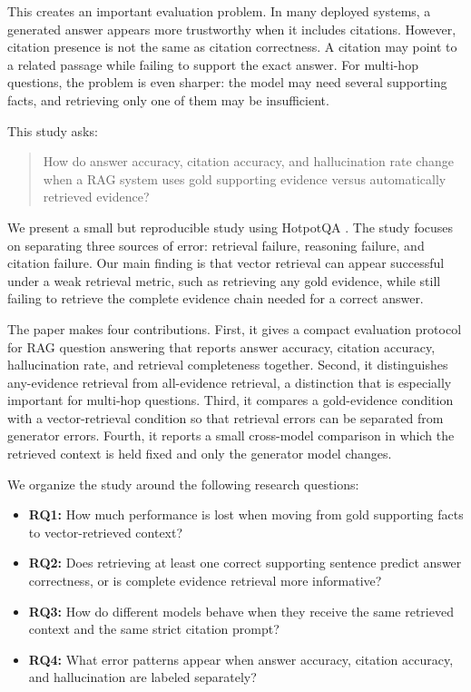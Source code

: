 \documentclass[10pt,twocolumn]{article}
\begin{document}
This creates an important evaluation problem. In many deployed systems, a generated answer appears more trustworthy when it includes citations. However, citation presence is not the same as citation correctness. A citation may point to a related passage while failing to support the exact answer. For multi-hop questions, the problem is even sharper: the model may need several supporting facts, and retrieving only one of them may be insufficient.

This study asks:

\begin{quote}
How do answer accuracy, citation accuracy, and hallucination rate change when a RAG system uses gold supporting evidence versus automatically retrieved evidence?
\end{quote}

We present a small but reproducible study using HotpotQA \citep{yang2018hotpotqa}. The study focuses on separating three sources of error: retrieval failure, reasoning failure, and citation failure. Our main finding is that vector retrieval can appear successful under a weak retrieval metric, such as retrieving any gold evidence, while still failing to retrieve the complete evidence chain needed for a correct answer.

The paper makes four contributions. First, it gives a compact evaluation protocol for RAG question answering that reports answer accuracy, citation accuracy, hallucination rate, and retrieval completeness together. Second, it distinguishes any-evidence retrieval from all-evidence retrieval, a distinction that is especially important for multi-hop questions. Third, it compares a gold-evidence condition with a vector-retrieval condition so that retrieval errors can be separated from generator errors. Fourth, it reports a small cross-model comparison in which the retrieved context is held fixed and only the generator model changes.

We organize the study around the following research questions:

\begin{itemize}[leftmargin=*]
    \item \textbf{RQ1:} How much performance is lost when moving from gold supporting facts to vector-retrieved context?
    \item \textbf{RQ2:} Does retrieving at least one correct supporting sentence predict answer correctness, or is complete evidence retrieval more informative?
    \item \textbf{RQ3:} How do different models behave when they receive the same retrieved context and the same strict citation prompt?
    \item \textbf{RQ4:} What error patterns appear when answer accuracy, citation accuracy, and hallucination are labeled separately?
\end{itemize}
\end{document}
